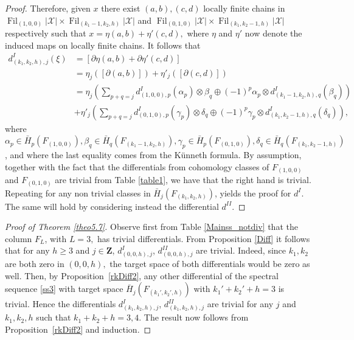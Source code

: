 \documentclass[10pt,a4paper,twoside]{amsart}
\theoremstyle{plain}
\theoremstyle{definition}
\theoremstyle{remark}
\begin{document}
\begin{proof}
Therefore, given $x$ there exist $(a, b),(c,d)$ locally finite chains in $\operatorname{Fil}_{(1,0,0)}|\mathcal{X}|\times\operatorname{Fil}_{(k_1-1,k_2,h)}|\mathcal{X}|$ and \sloppy$\operatorname{Fil}_{(0,1,0)}|\mathcal{X}|\times\operatorname{Fil}_{(k_1,k_2-1,h)}|\mathcal{X}|$ respectively such that $x=\eta(a,b)+\eta'(c,d),$ where $\eta$ and $\eta'$ now 
denote the induced maps on locally finite chains. It follows that 
\begin{align*}
d_{{(k_1,k_2,h),j}}^I(\xi)&=\left[\partial\eta(a,b)+\partial\eta'(c,d)\right]\\
&=\eta_j(\left[\partial(a,b)\right])+\eta'_j(\left[\partial(c,d)\right])\\
&=\eta_{j}\left(\sum_{p+q=j}d_{(1,0,0),p}^I(\alpha_p)\otimes\beta_q\oplus(-1)^p\alpha_p\otimes d_{(k_1-1,k_2,h),q}^I(\beta_q)\right)\\
&+\eta'_{j}\left(\sum_{p+q=j}d_{(0,1,0),p}^I(\gamma_p)\otimes\delta_q\oplus(-1)^p\gamma_p\otimes d_{(k_1,k_2-1,h),q}^I(\delta_q)\right),
\end{align*}
where $\alpha_p\in \bar{H}_p(F_{(1,0,0)}),\beta_q\in\bar{H}_q(F_{(k_1-1,k_2,h)}),\gamma_p\in \bar{H}_p(F_{(0,1,0)}),\delta_q\in\bar{H}_q(F_{(k_1,k_2-1,h)})$, and where the last equality comes from the K\"unneth formula.
By assumption, together with the fact that the differentials from cohomology classes of $F_{(1,0,0)}$ and $F_{(0,1,0)}$ are trivial from Table \ref{table1}, we have that the right hand is trivial. Repeating for any non trivial classes in 
$\bar{H}_j(F_{(k_1,k_2,h)})$, yields the proof for $d^I$.
The same will hold by considering instead the differential $d^{II}.$
\end{proof}


\begin{proof}[Proof of Theorem \ref{theo5.7}] 
   Observe first from Table \ref{Mainss_notdiv} that the column $F_L$, with $L=3,$ has trivial differentials.  
    From Proposition \ref{Diff} it follows that  
    for any $h\geq 3$ and $j\in \mathbf{Z}$, $d^I_{(0,0,h),j}$, $d^{II}_{(0,0,h),j}$ are 
    trivial.
    Indeed, since $k_1,k_2$ are both zero in $(0,0,h),$ the target space of both differentials would be zero as well. 
    Then, by Proposition~\ref{rkDiff2}, 
    any other differential of the spectral sequence \eqref{ss3} with target space $\bar{H}_j(F_{(k_1',k_2',h)})$ with  $k_1'+k_2'+h=3$ is trivial. Hence the differentials $d^I_{(k_1,k_2,h),j}$, $d^{II}_{(k_1,k_2,h),j}$ are trivial for any $j$ and $k_1,k_2,h$ such that $k_1+k_2+h=3, 4$. The result now follows from Proposition~\ref{rkDiff2} and induction. 
\end{proof}
\end{document}
